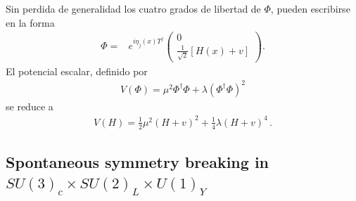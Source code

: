 \begin{frame}
Sin perdida de generalidad los cuatro grados de libertad de $\Phi$, pueden escribirse en la forma
\begin{align}
\label{eq:polarhiggs}
  \Phi=&e^{i\eta_j(x)T^j}
  \begin{pmatrix}
    0\\
    \frac{1}{\sqrt{2}}[H(x)+v]
  \end{pmatrix}.
\end{align}
El potencial escalar, definido por
\begin{align}
  V(\Phi)=\mu^2\Phi^\dagger\Phi+\lambda(\Phi^\dagger\Phi)^2
\end{align}
se reduce a
\begin{align}
  V(H)=\frac{1}{2}\mu^2(H+v)^2+\frac{1}{4}\lambda (H+v)^4\,.
\end{align}

\end{frame}
\subsection{Spontaneous symmetry breaking in $SU(3)_c\times  SU(2)_L\times  U(1)_Y$}

